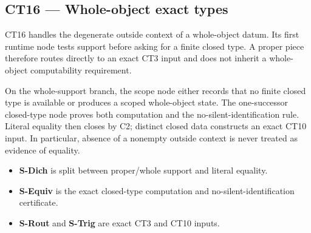 \subsection{CT16 --- Whole-object exact types}\label{ct:16}\label{the-whole-object-piece-exact-types-under-context-degeneracy}

CT16 handles the degenerate outside context of a whole-object datum.  Its
first runtime node tests support before asking for a finite closed type.  A
proper piece therefore routes directly to an exact CT3 input and does not
inherit a whole-object computability requirement.

On the whole-support branch, the scope node either records that no finite
closed type is available or produces a scoped whole-object state.  The
one-successor closed-type node proves both computation and the
no-silent-identification rule.  Literal equality then closes by C2; distinct
closed data constructs an exact CT10 input.  In particular, absence of a
nonempty outside context is never treated as evidence of equality.

\begin{itemize}
\tightlist
\item \textbf{S-Dich} is split between proper/whole support and literal equality.
\item \textbf{S-Equiv} is the exact closed-type computation and no-silent-identification certificate.
\item \textbf{S-Rout} and \textbf{S-Trig} are exact CT3 and CT10 inputs.
\end{itemize}

